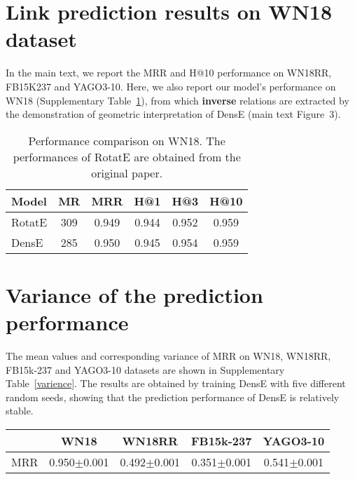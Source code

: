 \documentclass[11pt]{article}
\begin{document}
\section{Link prediction results on WN18 dataset}

In the main text, we report the MRR and H@10 performance on WN18RR, FB15K237 and YAGO3-10. Here, we also report our model's performance on WN18 (Supplementary Table~\ref{WN18}), from which \textbf{inverse} relations are extracted by the demonstration of geometric interpretation of DensE (main text Figure~3).

\begin{table}[]
\centering
\caption{Performance comparison on WN18. The performances of RotatE are obtained from the original paper.}
 \begin{tabular}{ l c c c c c }
  \toprule
  
Model & MR & MRR	&H@1	&H@3&	H@10\\
  \midrule
RotatE	&	309	&	0.949	&	0.944	&	0.952	&	0.959		\\
DensE	&	285	&	0.950	&	0.945	&	0.954	&	0.959	\\
  \bottomrule
\bottomrule
  \end{tabular} 
\label{WN18}

\end{table}








\section{Variance of the prediction performance}

The mean values and corresponding variance of MRR on WN18, WN18RR, FB15k-237 and YAGO3-10 datasets are shown in Supplementary Table~\ref{varience}. The results are obtained by training DensE with five different random seeds, showing that the prediction performance of DensE is relatively stable. 

\begin{table*}[!h]
\centering
\caption{The mean values and variance of MRR on WN18, WN18RR, FB15k-237 and YAGO3-10 datasets.}

 \begin{tabular}{ l c c c c  }
  \toprule
   ~ & WN18 & WN18RR & FB15k-237  & YAGO3-10 \\  
  \midrule
  MRR  & 0.950\(\pm\)0.001    & 0.492\(\pm\)0.001  & 0.351\(\pm\)0.001   & 0.541\(\pm\)0.001  \\ 
 \bottomrule
\end{tabular} 
\label{varience}
\end{table*}







\end{document}
